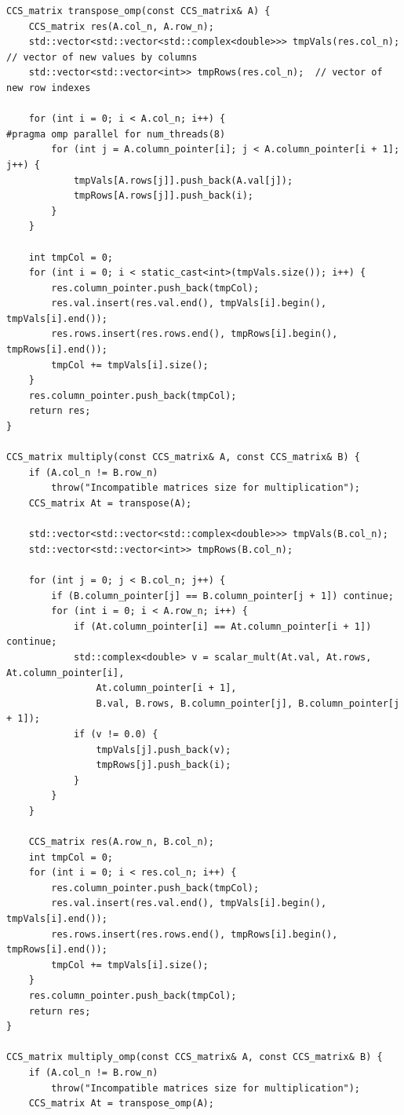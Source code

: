 \documentclass{report}
\begin{document}
\begin{lstlisting}
CCS_matrix transpose_omp(const CCS_matrix& A) {
    CCS_matrix res(A.col_n, A.row_n);
    std::vector<std::vector<std::complex<double>>> tmpVals(res.col_n);  // vector of new values by columns
    std::vector<std::vector<int>> tmpRows(res.col_n);  // vector of new row indexes

    for (int i = 0; i < A.col_n; i++) {
#pragma omp parallel for num_threads(8)
        for (int j = A.column_pointer[i]; j < A.column_pointer[i + 1]; j++) {
            tmpVals[A.rows[j]].push_back(A.val[j]);
            tmpRows[A.rows[j]].push_back(i);
        }
    }

    int tmpCol = 0;
    for (int i = 0; i < static_cast<int>(tmpVals.size()); i++) {
        res.column_pointer.push_back(tmpCol);
        res.val.insert(res.val.end(), tmpVals[i].begin(), tmpVals[i].end());
        res.rows.insert(res.rows.end(), tmpRows[i].begin(), tmpRows[i].end());
        tmpCol += tmpVals[i].size();
    }
    res.column_pointer.push_back(tmpCol);
    return res;
}

CCS_matrix multiply(const CCS_matrix& A, const CCS_matrix& B) {
    if (A.col_n != B.row_n)
        throw("Incompatible matrices size for multiplication");
    CCS_matrix At = transpose(A);

    std::vector<std::vector<std::complex<double>>> tmpVals(B.col_n);
    std::vector<std::vector<int>> tmpRows(B.col_n);

    for (int j = 0; j < B.col_n; j++) {
        if (B.column_pointer[j] == B.column_pointer[j + 1]) continue;
        for (int i = 0; i < A.row_n; i++) {
            if (At.column_pointer[i] == At.column_pointer[i + 1]) continue;
            std::complex<double> v = scalar_mult(At.val, At.rows, At.column_pointer[i],
                At.column_pointer[i + 1],
                B.val, B.rows, B.column_pointer[j], B.column_pointer[j + 1]);
            if (v != 0.0) {
                tmpVals[j].push_back(v);
                tmpRows[j].push_back(i);
            }
        }
    }

    CCS_matrix res(A.row_n, B.col_n);
    int tmpCol = 0;
    for (int i = 0; i < res.col_n; i++) {
        res.column_pointer.push_back(tmpCol);
        res.val.insert(res.val.end(), tmpVals[i].begin(), tmpVals[i].end());
        res.rows.insert(res.rows.end(), tmpRows[i].begin(), tmpRows[i].end());
        tmpCol += tmpVals[i].size();
    }
    res.column_pointer.push_back(tmpCol);
    return res;
}

CCS_matrix multiply_omp(const CCS_matrix& A, const CCS_matrix& B) {
    if (A.col_n != B.row_n)
        throw("Incompatible matrices size for multiplication");
    CCS_matrix At = transpose_omp(A);


\end{lstlisting}
\end{document}
